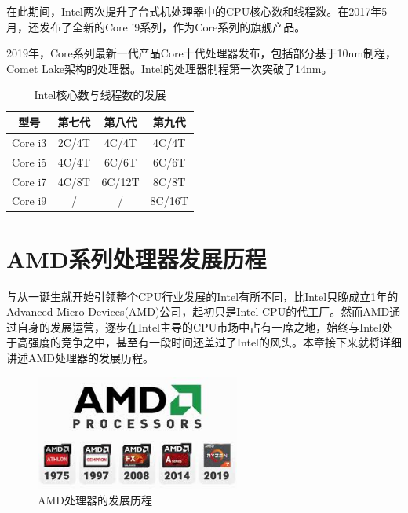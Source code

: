 \documentclass[UTF8]{ctexart}
\begin{document}
在此期间，Intel两次提升了台式机处理器中的CPU核心数和线程数。在2017年5月，还发布了全新的Core i9系列，作为Core系列的旗舰产品。
\begin{figure}[H]
    \centering
\end{figure}


2019年，Core系列最新一代产品Core十代处理器发布，包括部分基于10nm制程，Comet Lake架构的处理器。Intel的处理器制程第一次突破了14nm。
\begin{table}[H]
    \centering
    \caption{Intel核心数与线程数的发展}
    \begin{tabular}{cccc}
        \toprule
        型号    & 第七代 & 第八代 & 第九代 \\
        \midrule
        Core i3 & 2C/4T  & 4C/4T  & 4C/4T  \\
        Core i5 & 4C/4T  & 6C/6T  & 6C/6T  \\
        Core i7 & 4C/8T  & 6C/12T & 8C/8T  \\
        Core i9 & /      & /      & 8C/16T \\
        \bottomrule
    \end{tabular}
\end{table}
\newpage



\section{AMD系列处理器发展历程}
与从一诞生就开始引领整个CPU行业发展的Intel有所不同，比Intel只晚成立1年的Advanced Micro Devices(AMD)公司，起初只是Intel CPU的代工厂。然而AMD通过自身的发展运营，逐步在Intel主导的CPU市场中占有一席之地，始终与Intel处于高强度的竞争之中，甚至有一段时间还盖过了Intel的风头。本章接下来就将详细讲述AMD处理器的发展历程。
\begin{figure}[H]
    \begin{center}
        \includegraphics[width=0.6\textwidth]{figure/AMDdev.jpg}
        \caption{AMD处理器的发展历程}
    \end{center}
\end{figure}
\end{document}

